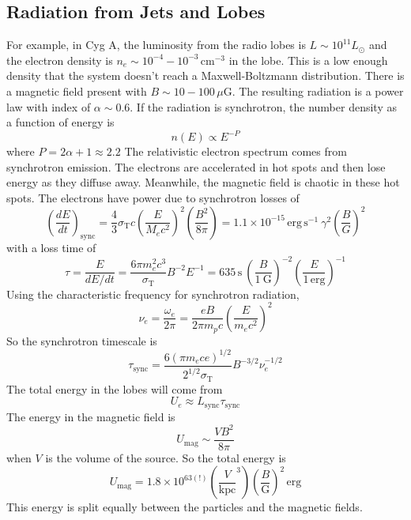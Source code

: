 \documentclass[10pt]{article}
\numberwithin{equation}{section}
\begin{document}
	\subsection{Radiation from Jets and Lobes} %
	\label{sub:radiation_from_jets_and_lobes}
	For example, in Cyg A, the luminosity from the radio lobes is $L\sim 10^{11}L_\odot$ and the electron density is $n_e \sim 10^{-4}-10^{-3}\,\mathrm{cm^{-3}}$ in the lobe. This is a low enough density that the system doesn't reach a Maxwell-Boltzmann distribution. There is a magnetic field present with $B\sim 10-100\,\mu\mathrm{G}$. The resulting radiation is a power law with index of $\alpha\sim 0.6$. If the radiation is synchrotron, the number density as a function of energy is
	\begin{equation}
		\label{eq:jets:5} n(E) \propto E^{-P}
	\end{equation}
	where $P = 2\alpha + 1 \approx 2.2$
	The relativistic electron spectrum comes from synchrotron emission. The electrons are accelerated in hot spots and then lose energy as they diffuse away. Meanwhile, the magnetic field is chaotic in these hot spots. The electrons have power due to synchrotron losses of 
	\begin{equation}
		\label{eq:jets:6} \left(\frac{dE}{dt}\right)_{\mathrm{sync}} = \frac{4}{3}\sigma_{\mathrm{T}}c\left(\frac{ E }{ M_e c^2}\right)^2\left(\frac{B^2}{8\pi}\right) = 1.1\times 10^{-15}\,\mathrm{erg\,s^{-1}}\ \gamma^2\left(\frac{B}{G}\right)^2
	\end{equation}
	with a loss time of
	\begin{equation}
		\label{eq:jets:7} \tau = \frac{E}{dE/dt} = \frac{6\pi m_e^2 c^3}{\sigma_{\mathrm{T}}} B^{-2} E^{-1} = 635\,\mathrm{s}\ \left(\frac{B}{1\ \mathrm{G}}\right)^{-2}\left(\frac{E}{1\,\mathrm{erg}}\right)^{-1}
	\end{equation}
	Using the characteristic frequency for synchrotron radiation,
	\begin{equation}
		\label{eq:jets:8} \nu_e = \frac{\omega_e}{2\pi} = \frac{eB}{2\pi m_pc}\left(\frac{ E}{m_ec^2}\right)^2 
	\end{equation}
	So the synchrotron timescale is
	\begin{equation}
		\label{eq:jets:9} \tau_{\mathrm{sync}} = \frac{6(\pi m_e c e)^{1/2}}{2^{1/2}\sigma_{\mathrm{T}}} B^{-3/2} \nu_e^{-1/2}
	\end{equation}
	The total energy in the lobes will come from 
	\begin{equation}
		\label{eq:jets:10} U_e \approx L_{\mathrm{sync}}\tau_{\mathrm{sync}}
	\end{equation}
	The energy in the magnetic field is 
	\begin{equation}
		\label{eq:jets:11} U_{\mathrm{mag}} \sim \frac{VB^2}{8\pi}
	\end{equation}
	when $V$ is the volume of the source. So the total energy is 
	\begin{equation}
		\label{eq:jets:12} U_{\mathrm{mag}} = 1.8\times 10^{63(!)}\left(\frac{V}{\mathrm{kpc}}^3\right)\left(\frac{B}{\mathrm{G}}\right)^2\,\mathrm{erg}
	\end{equation}
	This energy is split equally between the particles and the magnetic fields.\\
	
\end{document}
